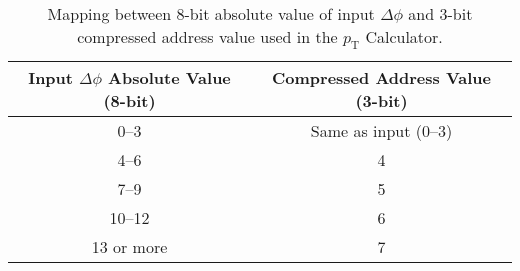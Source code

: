 \begin{table}[htbp]
  \centering
  \caption{Mapping between 8-bit absolute value of input \(\Delta\phi\) and 3-bit compressed address value used in the $p_\mathrm{T}$ Calculator.}
  \label{tab:phi_encoding}
  \begin{tabular}{c|c}
    \hline
    Input \(\Delta\phi\) Absolute Value (8-bit) & Compressed Address Value (3-bit) \\
    \hline
    0--3     & Same as input (0--3) \\
    4--6     & 4 \\
    7--9     & 5 \\
    10--12   & 6 \\
    13 or more & 7 \\
    \hline
  \end{tabular}
\end{table}